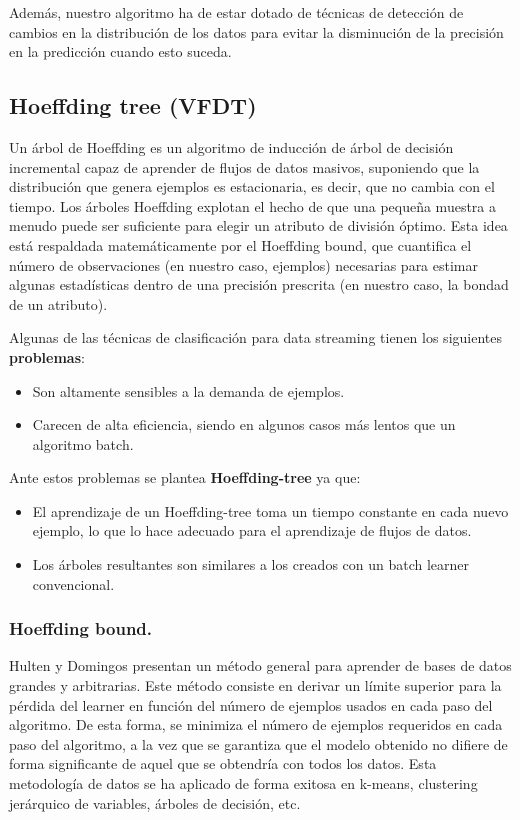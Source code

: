 Además, nuestro algoritmo ha de estar dotado de técnicas de detección de cambios en la distribución de los datos para evitar la disminución de la precisión en la predicción cuando esto suceda.

\subsection{Hoeffding tree (VFDT)}

Un árbol de Hoeffding es un algoritmo de inducción de árbol de decisión incremental capaz de aprender de flujos de datos masivos, suponiendo que la distribución que genera ejemplos es estacionaria, es decir, que no cambia con el tiempo. Los árboles Hoeffding explotan el hecho de que una pequeña muestra a menudo puede ser suficiente para elegir un atributo de división óptimo. Esta idea está respaldada matemáticamente por el Hoeffding bound, que cuantifica el número de observaciones (en nuestro caso, ejemplos) necesarias para estimar algunas estadísticas dentro de una precisión prescrita (en nuestro caso, la bondad de un atributo). \cite{ref9}

Algunas de las técnicas de clasificación para data streaming tienen los siguientes \textbf{problemas}:
\begin{itemize}
	\item Son altamente sensibles a la demanda de ejemplos.
	\item Carecen de alta eficiencia, siendo en algunos casos más lentos que un algoritmo batch.
\end{itemize}

Ante estos problemas se plantea\textbf{ Hoeffding-tree} ya que:
\begin{itemize}
	\item El aprendizaje de un Hoeffding-tree toma un tiempo constante en cada nuevo ejemplo, lo que lo hace adecuado para el aprendizaje de flujos de datos.
	\item Los árboles resultantes son similares a los creados con un batch learner convencional.
\end{itemize}

\subsubsection{Hoeffding bound.}

Hulten y Domingos presentan un método general para aprender de bases de datos grandes y arbitrarias.
Este método consiste en derivar un límite superior para la pérdida del learner en función del número de ejemplos usados en cada paso del algoritmo. De esta forma, se minimiza el número de ejemplos requeridos en cada paso del algoritmo, a la vez que se garantiza que el modelo obtenido no difiere de forma significante de aquel que se obtendría con todos los datos. Esta metodología de datos se ha aplicado de forma exitosa en k-means, clustering jerárquico de variables, árboles de decisión, etc.


